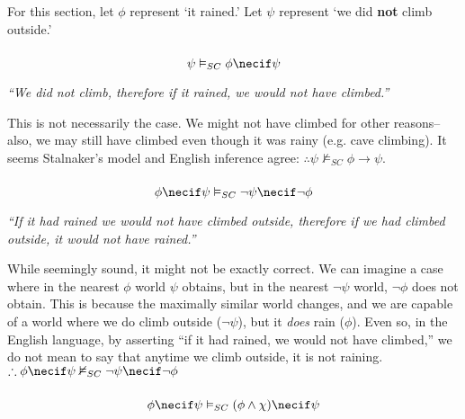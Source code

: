 \documentclass{article}
\begin{document}
        For this section, let $\phi$ represent `it rained.'
        Let $\psi$ represent `we did \textbf{not} climb outside.'
            \subsubsection{}
            $$\psi \vDash_{SC} \phi \necif \psi$$

            \begin{center}
                \textit{``We did not climb, therefore if it rained, we would not have climbed.''}
            \end{center}

            This is not necessarily the case. We might not have climbed for other reasons-- also, we may still have climbed even though it was rainy (e.g. cave climbing). It seems Stalnaker's model and English inference agree:
            $\therefore \psi \nvDash_{SC} \phi \rightarrow \psi$.

            \subsubsection{}
            $$\phi \necif \psi \vDash_{SC} \lnot \psi \necif \lnot \phi$$

            \begin{center}
                \textit{``If it had rained we would not have climbed outside, therefore if we had climbed outside, it would not have rained.''}
            \end{center}

            While seemingly sound, it might not be exactly correct. We can imagine a case where in the nearest $\phi$ world $\psi$ obtains, but in the nearest $\lnot \psi$ world, $\lnot \phi$ does not obtain.
            This is because the maximally similar world changes, and we are capable of a world where we do climb outside ($\lnot \psi$), but it \textit{does} rain ($\phi$).
            Even so, in the English language, by asserting ``if it had rained, we would not have climbed,'' we do not mean to say that anytime we climb outside, it is not raining.
            $\therefore \phi \necif \psi \nvDash_{SC} \lnot \psi \necif \lnot \phi$

            \subsubsection{}
            $$\phi \necif \psi \vDash_{SC} (\phi \wedge \chi) \necif \psi$$
\end{document}
